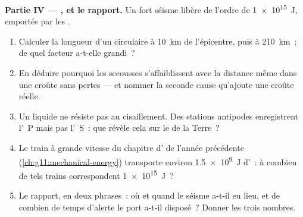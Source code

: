 \begin{problem}
\medskip
\noindent\textbf{Partie IV --- , et le rapport.}
Un fort séisme libère de l'ordre de \qty{1e15}{J}, emportés par les
.
\begin{enumerate}[resume]
  \item Calculer la longueur d'un  circulaire à
        \qty{10}{km} de l'épicentre, puis à \qty{210}{km}~; de quel
        facteur a-t-elle grandi~?
  \item En déduire pourquoi les secousses s'affaiblissent avec la
        distance même dans une croûte sans pertes --- et nommer la
        seconde cause qu'ajoute une croûte réelle.
  \item Un liquide ne résiste pas au cisaillement. Des stations
        antipodes enregistrent l'~P mais pas l'~S~: que révèle
        cela sur le  de la Terre~?
  \item Le train à grande vitesse du chapitre d' de l'année
        précédente (\cref{ch:g11:mechanical-energy}) transporte environ
        \qty{1.5e9}{J} d'~: à combien de
        tels trains correspondent \qty{1e15}{J}~?
  \item Le rapport, en deux phrases~: où et quand le séisme a-t-il eu
        lieu, et de combien de temps d'alerte le port a-t-il disposé~?
        Donner les trois nombres.
\end{enumerate}
\end{problem}

